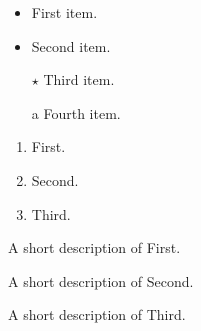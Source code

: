 \begin{itemize}
\item First item.
\item Second item.
\item[$\star$] Third item.
\item[a] Fourth item.
\end{itemize}

\begin{enumerate}
\item First.
\item Second.
\item Third.
\end{enumerate}

\begin{description}[longestitem]
\item[First] A short description of First.
\item[Second] A short description of Second.
\item[Third]  A short description of Third.
\end{description}
